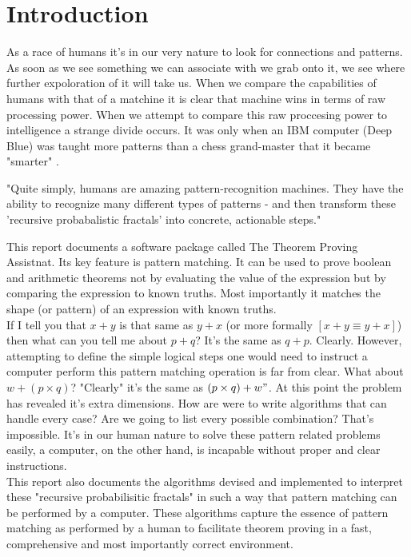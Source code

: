 \documentclass{article}
\newcommand{\enterProblemHeader}[1]{
\nobreak\extramarks{#1}{#1}\nobreak
\nobreak\extramarks{#1}{#1}\nobreak
}
\newcommand{\exitProblemHeader}[1]{
\nobreak\extramarks{#1}{#1 continued on next page\ldots}\nobreak
\nobreak\extramarks{#1}{}\nobreak
}
\newcounter{homeworkProblemCounter} %
\newcommand{\homeworkProblemName}{}
\newenvironment{homeworkProblem}[1][
 \arabic{homeworkProblemCounter}]{ %
\stepcounter{homeworkProblemCounter} %
\renewcommand{\homeworkProblemName}{#1} %
\section{\homeworkProblemName} %
\enterProblemHeader{} %
}{
\exitProblemHeader{} %
}
\begin{document}
\begin{homeworkProblem}[Introduction]

As a race of humans it's in our very nature to look for connections and patterns. As soon as we see something we can associate with we grab onto it, we see where further expoloration of it will take us. When we compare the capabilities of humans with that of a matchine it is clear that machine wins in terms of raw processing power. When we attempt to compare this raw proccesing power to intelligence a strange divide occurs. It was only when an IBM computer (Deep Blue) was taught more patterns than a chess grand-master that it became "smarter" \cite{DEEPBLUE:1997}.

\begin{displayquote}
"Quite simply, humans are amazing pattern-recognition machines. They have the ability to recognize many different types of patterns - and then transform these  'recursive probabalistic fractals' into concrete, actionable steps."\cite{PROBFRACT}
\end{displayquote}

This report documents a software package called The Theorem Proving Assistnat. Its key feature is pattern matching. It can be used to prove boolean and arithmetic theorems not by evaluating the value of the expression but by comparing the expression to known truths. Most importantly it matches the shape (or pattern) of an expression with known truths.\\

If I tell you that $x+y$ is that same as $y+x$ (or more formally $[x + y \equiv y + x]$) then what can you tell me about $p + q$? It's the same as $q + p$. Clearly. However, attempting to define the simple logical steps one would need to instruct a computer perform this pattern matching operation is far from clear. What about $w+(p \times q)$? "Clearly" it's the same as $(p \times q)+w"$. At this point the problem has revealed it's extra dimensions. How are were to write algorithms that can handle every case? Are we going to list every possible combination? That's impossible. It's in our human nature to solve these pattern related problems easily, a computer, on the other hand, is incapable without proper and clear instructions.\\

This report also documents the algorithms devised and implemented to interpret these "recursive probabilisitic fractals" in such a way that pattern matching can be performed by a computer. These algorithms capture the essence of pattern matching as performed by a human to facilitate theorem proving in a fast, comprehensive and most importantly correct environment.

\newpage
\end{homeworkProblem}
\end{document}
